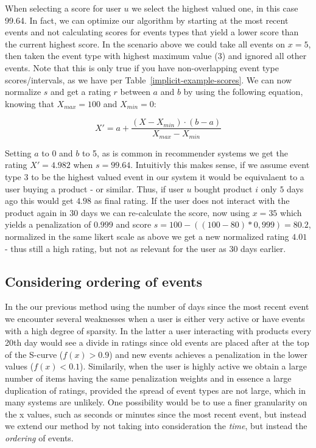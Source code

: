 When selecting a score for user $u$ we select the highest valued one, in this
case 99.64. In fact, we can optimize our algorithm by starting at the most
recent events and not calculating scores for events types that yield a lower
score than the current highest score. In the scenario above we could take all
events on $x=5$, then taken the event type with highest maximum value (3) and
ignored all other events. Note that this is only true if you have
non-overlapping event type scores/intervals, as we have per
Table~\ref{implicit-example-scores}. We can now normalize $s$ and get a rating
$r$ between $a$ and $b$ by using the following equation, knowing that $X_{max}
= 100$ and $X_{min} = 0$:

\begin{equation}
  X' = a + \frac{(X-X_{min})\cdot(b-a)}{X_{max}-X_{min}}
  \label{eq-normalization}
\end{equation}

Setting $a$ to 0 and $b$ to 5, as is common in recommender systems we get the
rating $X' = 4.982$ when $s = 99.64$. Intuitivly this makes sense, if we assume
event type 3 to be the highest valued event in our system it would be
equivalaent to a user buying a product - or similar. Thus, if user $u$ bought
product $i$ only $5$ days ago this would get $4.98$ as final rating. If the
user does not interact with the product again in 30 days we can re-calculate
the score, now using $x=35$ which yields a penalization of $0.999$ and score $s
= 100-((100-80)*0,999) = 80.2$, normalized in the same likert scale as above we
get a new normalized rating $4.01$ - thus still a high rating, but not as
relevant for the user as 30 days earlier.

\subsection{Considering ordering of events}

In the our previous method using the number of days since the most recent event
we encounter several weaknesses when a user is either very active or have
events with a high degree of sparsity. In the latter a user interacting with
products every 20th day would see a divide in ratings since old events are
placed after at the top of the S-curve ($f(x) > 0.9$) and new events achieves a
penalization in the lower values ($f(x) < 0.1$). Similarily, when the user is
highly active we obtain a large number of items having the same penalization
weights and in essence a large duplication of ratings, provided the spread of
event types are not large, which in many systems are unlikely. One possibility
would be to use a finer granularity on the x values, such as seconds or minutes
since the most recent event, but instead we extend our method by not taking
into consideration the \textit{time}, but instead the \textit{ordering} of
events.

